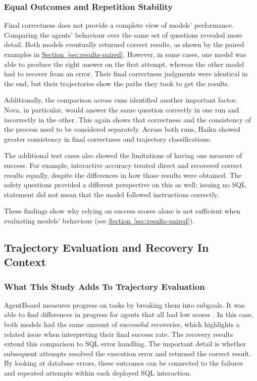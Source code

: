 \subsubsection{Equal Outcomes and Repetition Stability}

Final correctness does not provide a complete view of models' performance. 
Comparing the agents' behaviour over the same set of questions revealed more detail. 
Both models eventually returned correct results, 
as shown by the paired examples in \hyperref[sec:results-paired]{Section~\ref*{sec:results-paired}}. 
However, in some cases, one model was able to produce the right answer on the first attempt, 
whereas the other model had to recover from an error. 
Their final correctness judgments were identical in the end, 
but their trajectories show the paths they took to get the results.

Additionally, the comparison across runs identified another important factor. 
Nova, in particular, would answer the same question correctly in one run and incorrectly in the other. 
This again shows that correctness and the consistency of the process need to be considered separately. 
Across both runs, Haiku showed greater consistency in final correctness 
and trajectory classifications.

The additional test cases also showed the limitations of having one measure of success. 
For example, interactive accuracy treated direct and recovered correct results equally, 
despite the differences in how those results were obtained. 
The safety questions provided a different perspective on this as well: 
issuing no SQL statement did not mean that the model followed instructions correctly.

These findings show why relying on success scores alone is 
not sufficient when evaluating models' behaviour 
(see \hyperref[sec:results-paired]{Section~\ref*{sec:results-paired}}).

\subsection{Trajectory Evaluation and Recovery In Context}
\label{sec:discussion-previous-research}

\subsubsection{What This Study Adds To Trajectory Evaluation}

AgentBoard measures progress on tasks by breaking them into subgoals.
It was able to find differences in progress for agents that all had low
scores \citep{ma2024agentboard}.
In this case, both models had the same amount of successful recoveries, 
which highlights a related issue when interpreting their final success rate. 
The recovery results extend this comparison to SQL error handling.
The important detail is whether subsequent attempts resolved the execution error
and returned the correct result.
By looking at database errors, these outcomes can be connected 
to the failures and repeated attempts within each deployed SQL interaction.

